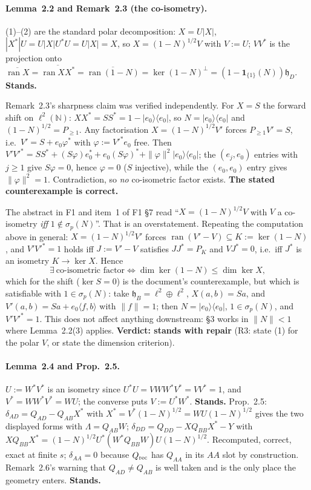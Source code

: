 \documentclass[11pt]{article}
\newcommand{\hh}{\mathfrak h}
\DeclareMathOperator{\ran}{ran}
\begin{document}
\paragraph{Lemma~2.2 and Remark~2.3 (the co-isometry).}
(1)--(2) are the standard polar decomposition: $X=U|X|$, $|X^*|U=U|X|U^*U=U|X|=X$, so
$X=(1-N)^{1/2}V$ with $V:=U$; $VV^*$ is the projection onto
$\overline{\ran X}=\overline{\ran XX^*}=\overline{\ran(1-N)}=\ker(1-N)^\perp
=(1-\mathbf1_{\{1\}}(N))\hh_D$.  \textbf{Stands.}

Remark~2.3's sharpness claim was verified independently.  For $X=S$ the forward shift on
$\ell^2(\mathbb N)$: $XX^*=SS^*=1-|e_0\rangle\langle e_0|$, so $N=|e_0\rangle\langle e_0|$
and $(1-N)^{1/2}=P_{\ge1}$.  Any factorisation $X=(1-N)^{1/2}V'$ forces $P_{\ge1}V'=S$,
i.e.\ $V'=S+e_0\varphi^*$ with $\varphi:=V'^*e_0$ free.  Then
$V'V'^*=SS^*+(S\varphi)e_0^*+e_0(S\varphi)^*+\|\varphi\|^2|e_0\rangle\langle e_0|$; the
$(e_j,e_0)$ entries with $j\ge1$ give $S\varphi=0$, hence $\varphi=0$ ($S$ injective),
while the $(e_0,e_0)$ entry gives $\|\varphi\|^2=1$.  Contradiction, so \emph{no}
co-isometric factor exists.  \textbf{The stated counterexample is correct.}

\begin{verdictgap}
The abstract in F1 and item~1 of F1 \S7 read ``$X=(1-N)^{1/2}V$ with $V$ a co-isometry
\emph{iff} $1\notin\sigma_p(N)$''.  That is an overstatement.  Repeating the computation
above in general: $X=(1-N)^{1/2}V'$ forces $\ran(V'-V)\subseteq K:=\ker(1-N)$, and
$V'V'^*=1$ holds iff $J:=V'-V$ satisfies $JJ^*=P_K$ and $VJ^*=0$, i.e.\ iff $J^*$ is an
isometry $K\to\ker X$.  Hence
\[ \exists\ \text{co-isometric factor}\iff \dim\ker(1-N)\le\dim\ker X , \]
which for the shift ($\ker S=0$) is the document's counterexample, but which is satisfiable
with $1\in\sigma_p(N)$: take $\hh_B=\ell^2\oplus\ell^2$, $X(a,b)=Sa$, and
$V'(a,b)=Sa+e_0\langle f,b\rangle$ with $\|f\|=1$; then $N=|e_0\rangle\langle e_0|$,
$1\in\sigma_p(N)$, and $V'V'^*=1$.  This does not affect anything downstream: \S3 works in
$\|N\|<1$ where Lemma~2.2(3) applies.  \textbf{Verdict: stands with repair} (R3: state
(1) for the polar $V$, or state the dimension criterion).
\end{verdictgap}

\paragraph{Lemma~2.4 and Prop.~2.5.}  $U:=W^*V^*$ is an isometry since
$U^*U=VWW^*V^*=VV^*=1$, and $V^*=WW^*V^*=WU$; the converse puts $V:=U^*W^*$.  \textbf{Stands.}
Prop.~2.5: $\delta_{AD}=Q_{AD}-Q_{AB}X^*$ with $X^*=V^*(1-N)^{1/2}=WU(1-N)^{1/2}$ gives
the two displayed forms with $\Lambda=Q_{AB}W$; $\delta_{DD}=Q_{DD}-XQ_{BB}X^*-Y$ with
$XQ_{BB}X^*=(1-N)^{1/2}U^*(W^*Q_{BB}W)U(1-N)^{1/2}$.  Recomputed, correct, exact at finite
$s$; $\delta_{AA}=0$ because $Q_{\rm rec}$ has $Q_{AA}$ in its $AA$ slot by construction.
Remark~2.6's warning that $Q_{AD}\ne Q_{AB}$ is well taken and is the only place the
geometry enters.  \textbf{Stands.}
\end{document}
